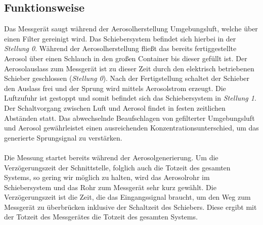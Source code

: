 \subsection{Funktionsweise}
Das Messger\"{a}t saugt w\"{a}hrend der Aerosolherstellung Umgebungsluft, welche \"{u}ber einen Filter gereinigt wird. Das Schiebersystem befindet sich hierbei in der \textit{Stellung 0}. W\"{a}hrend der Aerosolherstellung flie{\ss}t das bereits fertiggestellte Aerosol \"{u}ber einen Schlauch in den gro{\ss}en Container bis dieser gef\"{u}llt ist. Der Aerosolauslass zum Messger\"{a}t ist zu dieser Zeit durch den elektrisch betriebenen Schieber geschlossen (\textit{Stellung 0}). Nach der Fertigstellung schaltet der Schieber den Auslass frei und der Sprung wird mittels Aerosolstrom erzeugt. Die Luftzufuhr ist gestoppt und somit befindet sich das Schiebersystem in \textit{Stellung 1}. Der Schaltvorgang zwischen Luft und Aerosol findet in festen zeitlichen Abst\"{a}nden statt. Das abwechselnde Beaufschlagen von gefilterter Umgebungsluft und Aerosol gew\"{a}hrleistet einen ausreichenden Konzentrationsunterschied, um das generierte Sprungsignal zu verst\"{a}rken.
\\\\
Die Messung startet bereits w\"{a}hrend der Aerosolgenerierung. Um die Verz\"{o}gerungszeit der Schnittstelle, folglich auch die Totzeit des gesamten Systems, so gering wir m\"{o}glich zu halten, wird das Aerosolrohr im Schiebersystem und das Rohr zum Messger\"{a}t sehr kurz gew\"{a}hlt. Die Verz\"{o}gerungszeit ist die Zeit, die das Eingangssignal braucht, um den Weg zum Messger\"{a}t zu \"{u}berbr\"{u}cken inklusive der Schaltzeit des Schiebers. Diese ergibt mit der Totzeit des Messger\"{a}tes die Totzeit des gesamten Systems\cite{candle}.
